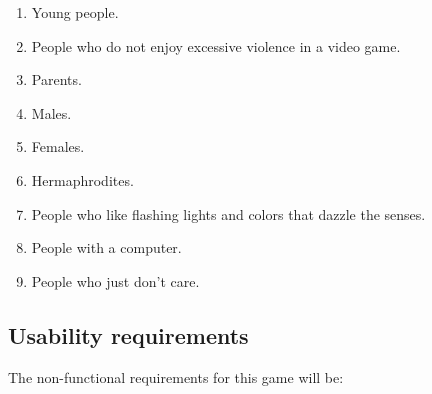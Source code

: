 \begin{enumerate}
  \item Young people.

  \item People who do not enjoy excessive violence in a video game.

  \item Parents.

  \item Males.

  \item Females.

  \item Hermaphrodites.

  \item People who like flashing lights and colors that dazzle the senses.

  \item People with a computer.

  \item People who just don't care.

\end{enumerate}

\subsection*{Usability requirements}

The non-functional requirements for this game will be:

